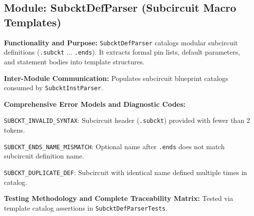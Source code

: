 \subsection{Module: SubcktDefParser (Subcircuit Macro Templates)}

\textbf{Functionality and Purpose:} \texttt{SubcktDefParser} catalogs modular subcircuit definitions (\texttt{.subckt} ... \texttt{.ends}). It extracts formal pin lists, default parameters, and statement bodies into template structures.

\textbf{Inter-Module Communication:} Populates subcircuit blueprint catalogs consumed by \texttt{SubcktInstParser}.

\textbf{Comprehensive Error Models and Diagnostic Codes:}
\begin{compactitem}
    \item \texttt{SUBCKT\_INVALID\_SYNTAX}: Subcircuit header (\texttt{.subckt}) provided with fewer than 2 tokens.
    \item \texttt{SUBCKT\_ENDS\_NAME\_MISMATCH}: Optional name after \texttt{.ends} does not match subcircuit definition name.
    \item \texttt{SUBCKT\_DUPLICATE\_DEF}: Subcircuit with identical name defined multiple times in catalog.
\end{compactitem}

\textbf{Testing Methodology and Complete Traceability Matrix:} Tested via template catalog assertions in \texttt{SubcktDefParserTests}.

